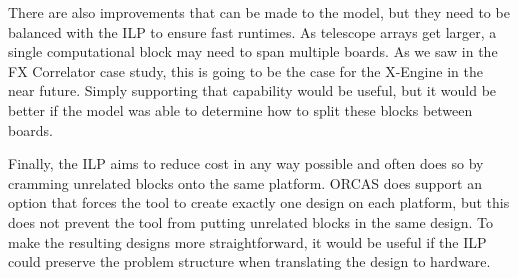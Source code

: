 There are also improvements that can be made to the model, but they need to be balanced with the ILP to ensure fast runtimes.
As telescope arrays get larger, a single computational block may need to span multiple boards.
As we saw in the FX Correlator case study, this is going to be the case for the X-Engine in the near future.
Simply supporting that capability would be useful, but it would be better if the model was able to determine how to split these blocks between boards.

Finally, the ILP aims to reduce cost in any way possible and often does so by cramming unrelated blocks onto the same platform.
ORCAS does support an option that forces the tool to create exactly one design on each platform, but this does not prevent the tool from putting unrelated blocks in the same design.
To make the resulting designs more straightforward, it would be useful if the ILP could preserve the problem structure when translating the design to hardware.


%
%
